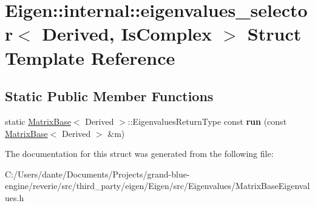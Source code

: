 \hypertarget{struct_eigen_1_1internal_1_1eigenvalues__selector}{}\section{Eigen\+::internal\+::eigenvalues\+\_\+selector$<$ Derived, Is\+Complex $>$ Struct Template Reference}
\label{struct_eigen_1_1internal_1_1eigenvalues__selector}
\subsection*{Static Public Member Functions}
\begin{DoxyCompactItemize}
\item 
\mbox{\label{struct_eigen_1_1internal_1_1eigenvalues__selector_a09979658def7adc9dd8e296689345519}} 
static \mbox{\hyperlink{class_eigen_1_1_matrix_base}{Matrix\+Base}}$<$ Derived $>$\+::Eigenvalues\+Return\+Type const {\bfseries run} (const \mbox{\hyperlink{class_eigen_1_1_matrix_base}{Matrix\+Base}}$<$ Derived $>$ \&m)
\end{DoxyCompactItemize}


The documentation for this struct was generated from the following file\+:\begin{DoxyCompactItemize}
\item 
C\+:/\+Users/dante/\+Documents/\+Projects/grand-\/blue-\/engine/reverie/src/third\+\_\+party/eigen/\+Eigen/src/\+Eigenvalues/Matrix\+Base\+Eigenvalues.\+h\end{DoxyCompactItemize}
